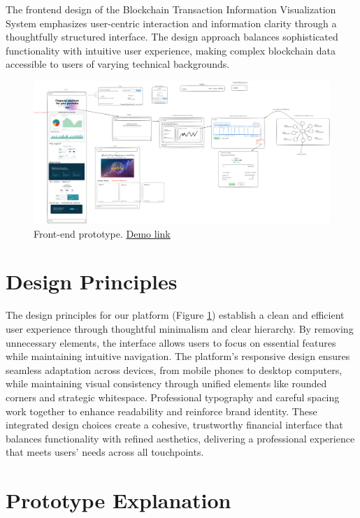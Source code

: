 The frontend design of the Blockchain Transaction Information Visualization System emphasizes user-centric interaction and information clarity through a thoughtfully structured interface. The design approach balances sophisticated functionality with intuitive user experience, making complex blockchain data accessible to users of varying technical backgrounds. 
\begin{figure}[h]
    \centering
    \includegraphics[width= 1\textwidth,  keepaspectratio]{root/image.png}
    \caption{Front-end prototype. \href{https://excalidraw.com/\#room=9d4fa2b42691ec469547,47-HCI7BFUW576wjGYaIXw}{Demo link}}
    \label{fig:prototype}
\end{figure}
\section{Design Principles}
The design principles for our platform (Figure \ref{fig:prototype}) establish a clean and efficient user experience through thoughtful minimalism and clear hierarchy. By removing unnecessary elements, the interface allows users to focus on essential features while maintaining intuitive navigation. The platform's responsive design ensures seamless adaptation across devices, from mobile phones to desktop computers, while maintaining visual consistency through unified elements like rounded corners and strategic whitespace. Professional typography and careful spacing work together to enhance readability and reinforce brand identity. These integrated design choices create a cohesive, trustworthy financial interface that balances functionality with refined aesthetics, delivering a professional experience that meets users' needs across all touchpoints.
\section{Prototype Explanation}
